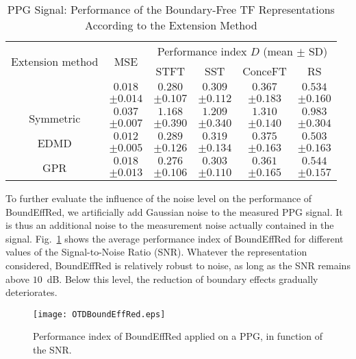 \begin{table}
\centering
\caption{PPG Signal: Performance of the Boundary-Free TF Representations According to the Extension Method}
\begin{tabular}{|c||c||c|c|c|c|}
  \hline
   \multirow{2}{38pt}{\centering Extension method} & \multirow{2}{29pt}{\centering MSE} &\multicolumn{4}{c|}{Performance index $D$ (mean $\pm$ SD)} \\
   \cline{3-6}
      & & STFT & SST & ConceFT & RS\\
   \hhline{|=#=#=|=|=|=|}
   \multirow{2}{38pt}{\centering {\sf SigExt}} & $0.018$ & $0.280$ & $0.309$ & $0.367$ & $0.534$ \\
    & $\pm 0.014$ & $\pm 0.107$ & $\pm 0.112$ & $\pm 0.183$ & $\pm 0.160$ \\
   \hline
   \multirow{2}{38pt}{\centering Symmetric} & $0.037$ & $1.168$ & $1.209$ & $1.310$ & $0.983$ \\
   & $\pm 0.007$ & $\pm 0.390$ & $\pm 0.340$ & $\pm 0.140$ & $\pm 0.304$ \\
   \hline
   \multirow{2}{38pt}{\centering EDMD} & $0.012$ & $0.289$ & $0.319$ & $0.375$ & $0.503$ \\
   & $\pm 0.005$ & $\pm 0.126$ & $\pm 0.134$ & $\pm 0.163$ & $\pm 0.163$ \\
   \hline
   \multirow{2}{38pt}{\centering GPR} & $0.018$ & $0.276$ & $0.303$ & $0.361$ & $0.544$ \\
   & $\pm 0.013$ & $\pm 0.106$ & $\pm 0.110$ & $\pm 0.165$ & $\pm 0.157$ \\
   \hline
\end{tabular}
\label{tab:otd.ppg}
\end{table}

To further evaluate the influence of the noise level on the performance of {\sf BoundEffRed}, we artificially add Gaussian noise to the measured PPG signal. It is thus an additional noise to the measurement noise actually contained in the signal. Fig.~\ref{fig:otd.noise} shows the average performance index of {\sf BoundEffRed} for different values of the Signal-to-Noise Ratio (SNR). Whatever the representation considered, {\sf BoundEffRed} is relatively robust to noise, as long as the SNR remains above $10$~dB. Below this level, the reduction of boundary effects gradually deteriorates.

\begin{figure}
\centering
\texttt{[image: OTDBoundEffRed.eps]}
\caption{Performance index of {\sf BoundEffRed} applied on a PPG, in function of the SNR.}
\label{fig:otd.noise}
\end{figure}


